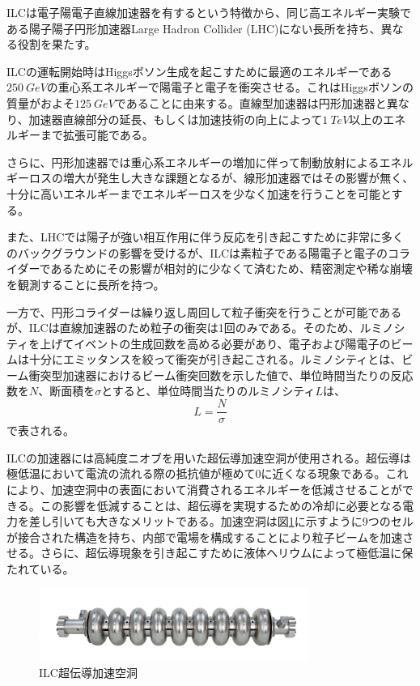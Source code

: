 ILCは電子陽電子直線加速器を有するという特徴から、同じ高エネルギー実験である陽子陽子円形加速器Large Hadron Collider (LHC)にない長所を持ち、異なる役割を果たす。

ILCの運転開始時はHiggsボソン生成を起こすために最適のエネルギーである$\SI{250}{GeV}$の重心系エネルギーで陽電子と電子を衝突させる。これはHiggsボソンの質量がおよそ$\SI{125}{GeV}$であることに由来する。直線型加速器は円形加速器と異なり、加速器直線部分の延長、もしくは加速技術の向上によって$\SI{1}{TeV}$以上のエネルギーまで拡張可能である。

さらに、円形加速器では重心系エネルギーの増加に伴って制動放射によるエネルギーロスの増大が発生し大きな課題となるが、線形加速器ではその影響が無く、十分に高いエネルギーまでエネルギーロスを少なく加速を行うことを可能とする。

また、LHCでは陽子が強い相互作用に伴う反応を引き起こすために非常に多くのバックグラウンドの影響を受けるが、ILCは素粒子である陽電子と電子のコライダーであるためにその影響が相対的に少なくて済むため、精密測定や稀な崩壊を観測することに長所を持つ。

一方で、円形コライダーは繰り返し周回して粒子衝突を行うことが可能であるが、ILCは直線加速器のため粒子の衝突は1回のみである。そのため、ルミノシティを上げてイベントの生成回数を高める必要があり、電子および陽電子のビームは十分にエミッタンスを絞って衝突が引き起こされる。ルミノシティとは、ビーム衝突型加速器におけるビーム衝突回数を示した値で、単位時間当たりの反応数を$N$、断面積を$\sigma$とすると、単位時間当たりのルミノシティ$L$は、
\begin{equation}
L = \frac{N}{\sigma}
\end{equation}
で表される。

ILCの加速器には高純度ニオブを用いた超伝導加速空洞が使用される。超伝導は極低温において電流の流れる際の抵抗値が極めて0に近くなる現象である。これにより、加速空洞中の表面において消費されるエネルギーを低減させることができる。この影響を低減することは、超伝導を実現するための冷却に必要となる電力を差し引いても大きなメリットである。加速空洞は図\ref{cavity}に示すように9つのセルが接合された構造を持ち、内部で電場を構成することにより粒子ビームを加速させる。さらに、超伝導現象を引き起こすために液体ヘリウムによって極低温に保たれている。

\begin{figure}[h]
	\begin{center}
		\includegraphics[width=250pt]{./Figure/Introduction/cavity.png}
		\caption[ILC超伝導加速空洞]{ILC超伝導加速空洞}
		\label{cavity}
	\end{center}
\end{figure}


